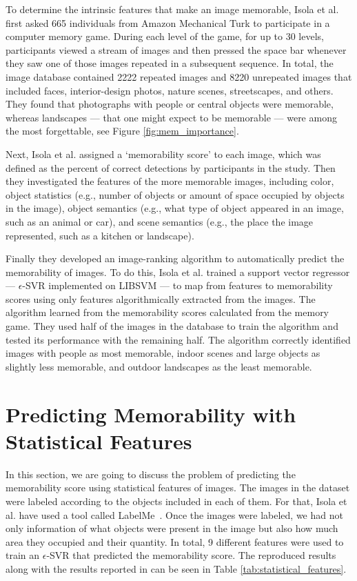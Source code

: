 \documentclass[10pt,twocolumn,letterpaper]{article}
\begin{document}
To determine the intrinsic features that make an image memorable, Isola et al. first asked 665 individuals from  Amazon Mechanical Turk to participate in a computer memory game. During each level of the game, for up to 30 levels, participants viewed a stream of images and then pressed the space bar whenever they saw one of those images repeated in a subsequent sequence. In total, the image database contained 2222 repeated images and 8220 unrepeated images that included faces, interior-design photos, nature scenes, streetscapes, and others. They found that photographs with people or central objects were memorable, whereas landscapes — that one might expect to be memorable — were among the most forgettable\cite{mem_post}, see Figure \ref{fig:mem_importance}.

Next, Isola et al. assigned a `memorability score' to each image, which was defined as the percent of correct detections by participants in the study. Then they investigated the features of the more memorable images, including color, object statistics (e.g., number of objects or amount of space occupied by objects in the image), object semantics (e.g., what type of object appeared in an image, such as an animal or car), and scene semantics (e.g., the place the image represented, such as a kitchen or landscape). 

Finally they developed an image-ranking algorithm to automatically predict the memorability of images. To do this, Isola et al. trained a support vector regressor — $\epsilon$-SVR implemented on LIBSVM\cite{libsvm} — to map from features to memorability scores using only features algorithmically extracted from the images. The algorithm learned from the memorability scores calculated from the memory game. They used half of the images in the database to train the algorithm and tested its performance with the remaining half. The algorithm correctly identified images with people as most memorable, indoor scenes and large objects as slightly less memorable, and outdoor landscapes as the least memorable.
\section{Predicting Memorability with Statistical Features}
In this section, we are going to discuss the problem of predicting the memorability score using statistical features of images. The images in the dataset were labeled according to the objects included in each of them. For that, Isola et al. have used a tool called LabelMe~\cite{labelme}. Once the images were labeled, we had not only information of what objects were present in the image but also how much area they occupied and their quantity. In total, 9 different features were used to train an $\epsilon$-SVR that predicted the memorability score. The reproduced results along with the results reported in \cite{Isola2011} can be seen in Table \ref{tab:statistical_features}.
\end{document}
